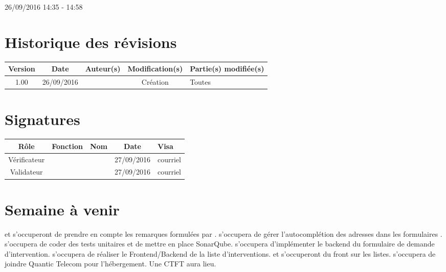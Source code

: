 \documentclass [a4paper] {article}
\begin{document}
26/09/2016			 				%
\hfill   
\hfill 	 14:35 - 14:58				%



\section*{Historique des révisions}
\begin{center}
			\begin{tabular}{| c | c | c | c | p{4cm} |}
				\hline
				\rowcolor{Gray}
				Version & Date & Auteur(s) & Modification(s) & Partie(s) modifiée(s)		 \\
				\hline
				1.00 & 26/09/2016 & \Kafui & Création & Toutes \\
		\hline		
			\end{tabular}
		\end{center}

\section*{Signatures}

		\begin{center}
			\begin{tabular}{| c | c | c | c | p{4cm} |}
				\hline
				\rowcolor{Gray}
				Rôle & Fonction & Nom & Date & Visa		 \\
				\hline
				Vérificateur & \RQ & \Melissa & 27/09/2016 & courriel \\[30pt]
				\hline
				Validateur & \CP & \Pierre & 27/09/2016 & courriel \\[30pt]	
				\hline
			\end{tabular}
		\end{center}

\section{Semaine à venir}
\Julie{} et \Melissa{} s'occuperont de prendre en compte les remarques formulées par \nomTuteurPedago{}. \Florian{} s'occupera de gérer l'autocomplétion des adresses dans les formulaires .
\Matthieu{} s'occupera de coder des tests unitaires et de mettre en place SonarQube.
\Kafui{} s'occupera d'implémenter le backend du formulaire de demande d'intervention. \Julie{} s'occupera de réaliser le Frontend/Backend de la liste d'interventions.
\Francois{} et \Juliana{} s'occuperont du front sur les listes.
\Pierre{} s'occupera de joindre Quantic Telecom pour l'hébergement.
Une CTFT aura lieu.






\end{document}
